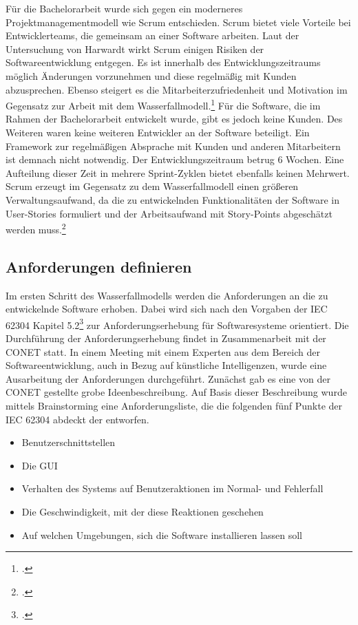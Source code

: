 Für die Bachelorarbeit wurde sich gegen ein moderneres Projektmanagementmodell wie Scrum entschieden. Scrum bietet viele Vorteile bei Entwicklerteams, die gemeinsam an einer Software arbeiten. Laut der Untersuchung von Harwardt wirkt Scrum einigen Risiken der Softwareentwicklung entgegen. Es ist innerhalb des Entwicklungszeitraums möglich Änderungen vorzunehmen und diese regelmäßig mit Kunden abzusprechen. Ebenso steigert es die Mitarbeiterzufriedenheit und Motivation im Gegensatz zur Arbeit mit dem Wasserfallmodell.\footcite{harwardt2012wasserfallmodell} Für die Software, die im Rahmen der Bachelorarbeit entwickelt wurde, gibt es jedoch keine Kunden. Des Weiteren waren keine weiteren Entwickler an der Software beteiligt. Ein Framework zur regelmäßigen Absprache mit Kunden und anderen Mitarbeitern ist demnach nicht notwendig. Der Entwicklungszeitraum betrug 6 Wochen. Eine Aufteilung dieser Zeit in mehrere Sprint-Zyklen bietet ebenfalls keinen Mehrwert. Scrum erzeugt im Gegensatz zu dem Wasserfallmodell einen größeren Verwaltungsaufwand, da die zu entwickelnden Funktionalitäten der Software in User-Stories formuliert und der Arbeitsaufwand mit Story-Points abgeschätzt werden muss.\footcite{wirdemann2022scrum}

\subsection{Anforderungen definieren}
Im ersten Schritt des Wasserfallmodells werden die Anforderungen an die zu entwickelnde Software erhoben. Dabei wird sich nach den Vorgaben der IEC 62304 Kapitel 5.2\footcite{daniel2018anforderungen} zur Anforderungserhebung für Softwaresysteme orientiert. Die Durchführung der Anforderungserhebung findet in Zusammenarbeit mit der CONET statt. In einem Meeting mit einem Experten aus dem Bereich der Softwareentwicklung, auch in Bezug auf künstliche Intelligenzen, wurde eine Ausarbeitung der Anforderungen durchgeführt. Zunächst gab es eine von der CONET gestellte grobe Ideenbeschreibung. Auf Basis dieser Beschreibung wurde mittels Brainstorming eine Anforderungsliste, die die folgenden fünf Punkte der IEC 62304 abdeckt der entworfen.

\begin{itemize}
\item Benutzerschnittstellen
\item Die GUI
\item Verhalten des Systems auf Benutzeraktionen im Normal- und Fehlerfall
\item Die Geschwindigkeit, mit der diese Reaktionen geschehen
\item Auf welchen Umgebungen, sich die Software installieren lassen soll
\end{itemize}

